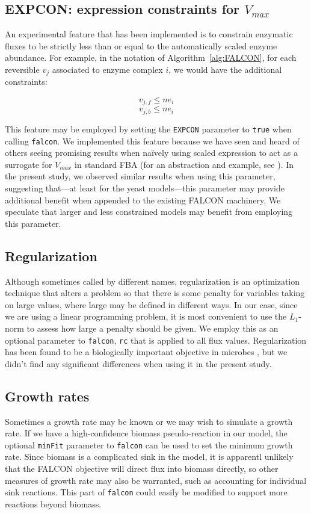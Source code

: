 \subsection{EXPCON: expression constraints for $V_{max}$}
An experimental feature that has been implemented is to constrain
enzymatic fluxes to be strictly less than or equal to the
automatically scaled enzyme abundance. For example, in the
notation of Algorithm~\ref{alg:FALCON}, for each reversible $v_j$
associated to enzyme complex $i$, we would have the additional
constraints:

\[ v_{j,f} \leq n e_i \]
\[ v_{j,b} \leq n e_i \]

This feature may be employed by setting the \texttt{EXPCON} parameter
to \texttt{true} when calling \texttt{falcon}. We implemented this
feature because we have seen and heard of others seeing promising
results when na\"ively using scaled expression to act as a surrogate for
$V_{max}$ in standard FBA (for an abstraction and example, see
\citealt{Colijn2009}). In the present study, we observed similar
results when using this parameter, suggesting that---at least for the
yeast models---this parameter may provide additional benefit when
appended to the existing FALCON machinery. We speculate that larger
and less constrained models may benefit from employing this parameter.

\subsection{Regularization}
Although sometimes called by different names, regularization is an
optimization technique that alters a problem so that there is some
penalty for variables taking on large values, where large may be
defined in different ways. In our case, since we are using a linear
programming problem, it is most convenient to use the $L_1$-norm to
assess how large a penalty should be given. We employ this as an
optional parameter to \texttt{falcon}, \texttt{rc} that is applied to
all flux values.  Regularization has been found to be a biologically
important objective in microbes \citep{Schuetz2012}, but we didn't
find any significant differences when using it in the present study.

\subsection{Growth rates}
Sometimes a growth rate may be known or we may wish to simulate a
growth rate. If we have a high-confidence biomass pseudo-reaction in
our model, the optional \texttt{minFit} parameter to \texttt{falcon}
can be used to set the minimum growth rate. Since biomass is a
complicated sink in the model, it is apparentl unlikely that the
FALCON objective will direct flux into biomass directly, so other
measures of growth rate may also be warranted, such as accounting
for individual sink reactions. This part of \texttt{falcon} could
easily be modified to support more reactions beyond biomass.

